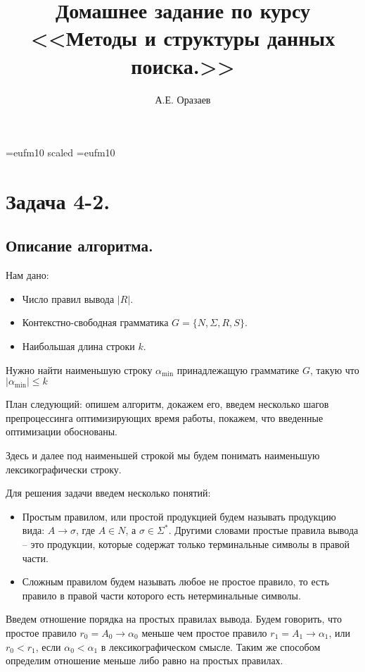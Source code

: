 \documentclass[12pt]{article}
\title{\bf Домашнее задание по курсу \\ <<Методы
и структуры данных поиска.>>}
\author{А.Е. Оразаев}
\date{}
\begin{document}
\voffset=-20mm
\hoffset=-12mm
\font\Got=eufm10 scaled \font\Got=eufm10

\maketitle

\section{Задача 4-2.}
\subsection{Описание алгоритма.}

Нам дано:
\begin{itemize}
    \item Число правил вывода $ |R| $.
    \item Контекстно-свободная грамматика $ G = \{N, \Sigma, R, S\} $.
    \item Наибольшая длина строки $ k $.
\end{itemize}

Нужно найти наименьшую строку $ \alpha_{\min} $ принадлежащую грамматике
$ G $, такую что $ |\alpha_{\min}| \le k $

План следующий: опишем алгоритм, докажем его, введем несколько шагов
препроцессинга оптимизирующих время работы, покажем, что введенные
оптимизации обоснованы.

Здесь и далее под наименьшей строкой мы будем понимать наименьшую
лексикографически строку.

Для решения задачи введем несколько понятий:
\begin{itemize}
    \item Простым правилом, или простой продукцией будем называть продукцию
          вида: $ A \rightarrow \sigma $, где $ A \in N $, а
          $ \sigma \in \Sigma^* $. Другими словами простые правила вывода --
          это продукции, которые содержат только терминальные символы в
          правой части.
    \item Сложным правилом будем называть любое не простое правило, то есть
          правило в правой части которого есть нетерминальные символы.
\end{itemize}

Введем отношение порядка на простых правилах вывода. Будем говорить, что
простое правило $ r_0 = A_0 \rightarrow \alpha_0 $ меньше чем простое
правило $ r_1 = A_1 \rightarrow \alpha_1 $, или $ r_0 < r_1 $,
если $ \alpha_0 < \alpha_1 $ в лексикографическом смысле.
Таким же способом определим отношение меньше либо равно на простых правилах.
\end{document}
